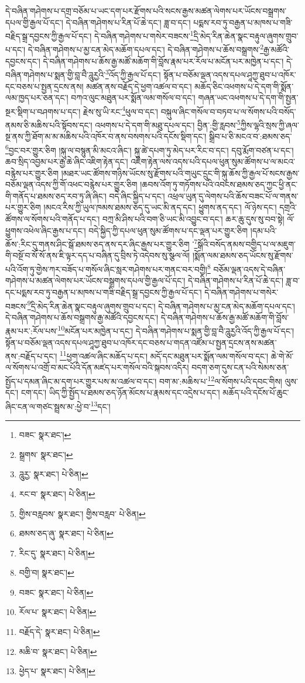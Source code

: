 དེ་བཞིན་གཤེགས་པ་དགྲ་བཅོམ་པ་ཡང་དག་པར་རྫོགས་པའི་སངས་རྒྱས་མཚན་ལེགས་པར་ཡོངས་བསྒྲགས་དཔལ་གྱི་རྒྱལ་པོ་དང་། དེ་བཞིན་གཤེགས་པ་རིན་པོ་ཆེ་དང་། ཟླ་བ་དང་། པདྨས་རབ་ཏུ་བརྒྱན་པ་མཁས་པ་གཟི་བརྗིད་སྒྲ་དབྱངས་ཀྱི་རྒྱལ་པོ་དང་། དེ་བཞིན་གཤེགས་པ་གསེར་བཟངས་\footnote{བཟང་  སྣར་ཐང་། }དྲི་མེད་རིན་ཆེན་སྣང་བརྟུལ་ཞུགས་གྲུབ་པ་དང་། དེ་བཞིན་གཤེགས་པ་མྱ་ངན་མེད་མཆོག་དཔལ་དང་། དེ་བཞིན་གཤེགས་པ་ཆོས་བསྒྲགས་\footnote{སྒྲགས་  སྣར་ཐང་། }རྒྱ་མཚོའི་དབྱངས་དང་། དེ་བཞིན་གཤེགས་པ་ཆོས་རྒྱ་མཚོ་མཆོག་གི་བློས་རྣམ་པར་རོལ་པ་མངོན་པར་མཁྱེན་པ་དང་། དེ་བཞིན་གཤེགས་པ་སྨན་གྱི་བླ་བཻ་ཌཱུརྱའི་\footnote{ཌཱུརྱ་  སྣར་ཐང་།  པེ་ཅིན། }འོད་ཀྱི་རྒྱལ་པོ་དང་། སྟོན་པ་བཅོམ་ལྡན་འདས་དཔལ་ཤཱཀྱ་ཐུབ་པ་འཁོར་དང་བཅས་པ་སྤྱན་དྲངས་ནས། མཚན་ནས་བརྗོད་དེ་ཕྱག་འཚལ་བ་དང་། མཆོད་ཅིང་འཕགས་པ་དེ་དག་གི་སྨོན་ལམ་ཁྱད་པར་ཅན་དང་། བཀའ་ལུང་མཐུན་པར་སྨོན་ལམ་གསོལ་བ་དང་། གཞན་ཡང་འཕགས་པ་དེ་དག་གི་སྤྱན་སྔར་སྡིག་པ་བཤགས་པ་དང་། རྗེས་སུ་ཡི་རང་\footnote{རང་བ་  སྣར་ཐང་།  པེ་ཅིན། }ཕུལ་བ་དང་། བསྐུལ་ཞིང་གསོལ་བ་བཏབ་པ་ལ་སོགས་པའི་བསོད་ནམས་ཅི་མཆིས་པའི་སྟོབས་དང་། འཕགས་པ་དེ་དག་གི་མཐུ་དཔལ་དང་། བྱིན་:གྱི་རླབས་\footnote{གྱིས་བརླབས་  སྣར་ཐང་། གྱིས་བརླབ་  པེ་ཅིན། }ཀྱིས་ལྷའི་སྲས་ཀྱི་ཞལ་སྔ་ནས་ཀྱི་ཐོག་མ་མ་མཆིས་པའི་འཁོར་བ་ནས་བསགས་པའི་དངོས་སྡིག་དང་། སྒྲིབ་པ་ཅི་མངའ་བ་:ཐམས་ཅད་\footnote{ཐམས་ཅད་ཞུ་  སྣར་ཐང་།  པེ་ཅིན། }བྱང་བར་གྱུར་ཅིག །སྐུ་ལ་བསྙུན་མི་མངའ་ཞིང་། སྐུ་ཚེ་དཔག་ཏུ་མེད་པར་རིང་བ་དང་། དབུ་རྨོག་བཙན་པ་དང་། ཆབ་སྲིད་འབྱམ་པར་རྒྱ་ཆེ་ཞིང་འཇིག་རྟེན་དང་། འཇིག་རྟེན་ལས་འདས་པའི་དཔལ་ཕུན་སུམ་ཚོགས་པ་ལ་མངའ་བརྙེས་པར་གྱུར་ཅིག །མཐར་ཡང་ཚོགས་གཉིས་ཡོངས་སུ་རྫོགས་པའི་གཡུང་དྲུང་གི་སྐུ་ཆོས་ཀྱི་རྒྱལ་པོ་སངས་རྒྱས་བཅོམ་ལྡན་འདས་ཀྱི་གོ་འཕང་བརྙེས་པར་གྱུར་ཅིག །ཆབས་འོག་ཏུ་གཏོགས་པའི་འབངས་ཐམས་ཅད་ཀྱང་ཕྱི་ནང་གི་གནོད་པ་ཐམས་ཅད་རབ་ཏུ་ཞི་ཞིང་། བདེ་ཞིང་སྐྱིད་པ་དང་། འཕྲལ་ཡུན་དུ་ལེགས་པའི་ཆོས་བཟང་པོ་ལ་གནས་པར་གྱུར་ཅིག །མངའ་རིས་ཀྱི་ཡུལ་ཁམས་ཐམས་ཅད་དུ་ཡང་མི་ནད་དང་། ཕྱུགས་ནད་དང་། ལོ་ཉེས་དང་། དགྲའི་ཚོགས་ལ་སོགས་པའི་གནོད་པ་དང་། བཀྲ་མི་ཤིས་པའི་བག་ཅི་ཡང་མི་འབྱུང་བ་དང་། ཆར་ཆུ་དུས་སུ་བབ་སྟེ། ལོ་ཕྱུགས་འཕེལ་ཞིང་རྒྱས་པ་དང་། བདེ་སྐྱིད་ཀྱི་དཔལ་ཕུན་སུམ་ཚོགས་པ་དང་ལྡན་པར་གྱུར་ཅིག །དམ་པའི་ཆོས་:རིང་དུ་གནས་ཤིང་སྒོ་ཐམས་ཅད་ནས་དར་ཞིང་རྒྱས་པར་གྱུར་ཅིག ་\footnote{རིང་དུ་  སྣར་ཐང་།  པེ་ཅིན། }སྒོའི་བསོད་ནམས་བགྱིད་པ་ལ་མཇུག་གི་བསྔོ་བ་སོ་སོ་ནས་ཇི་ལྟར་དད་པ་བཞིན་དུ་བྲིས་ཏེ་འདེབས་སུ་སྩལ་ལོ། །སྨོན་ལམ་ཐམས་ཅད་ཡོངས་སུ་རྫོགས་པའི་འོག་ཏུ་གྱེས་ཀར་བཟོད་པ་གསོལ་ཞིང་སླར་གཤེགས་པར་གནང་བར་བགྱི།\footnote{བགྱི་བ།  སྣར་ཐང་། } བཅོམ་ལྡན་འདས་དེ་བཞིན་གཤེགས་པ་མཚན་ལེགས་པར་ཡོངས་བསྒྲགས་དཔལ་གྱི་རྒྱལ་པོ་དང་། དེ་བཞིན་གཤེགས་པ་རིན་པོ་ཆེ་དང་། ཟླ་བ་དང་པདྨས་རབ་ཏུ་བརྒྱན་པ་མཁས་པ་གཟི་བརྗིད་སྒྲ་དབྱངས་ཀྱི་རྒྱལ་པོ་དང་། དེ་བཞིན་གཤེགས་པ་གསེར་བཟངས་\footnote{བཟང་  སྣར་ཐང་།  པེ་ཅིན། }དྲི་མེད་རིན་ཆེན་སྣང་བརྟུལ་ཞུགས་གྲུབ་པ་དང་། དེ་བཞིན་གཤེགས་པ་མྱ་ངན་མེད་མཆོག་དཔལ་དང་། དེ་བཞིན་གཤེགས་པ་ཆོས་བསྒྲགས་རྒྱ་མཚོའི་དབྱངས་དང་། དེ་བཞིན་གཤེགས་པ་ཆོས་རྒྱ་མཚོ་མཆོག་གི་བློས་རྣམ་པར་:རོལ་པས་\footnote{རོལ་པ་  སྣར་ཐང་།  པེ་ཅིན། }མངོན་པར་མཁྱེན་པ་དང་། དེ་བཞིན་གཤེགས་པ་སྨན་གྱི་བླ་བཻ་ཌཱུརྱའི་འོད་ཀྱི་རྒྱལ་པོ་དང་། སྟོན་པ་བཅོམ་ལྡན་འདས་དཔལ་ཤཱཀྱ་ཐུབ་པ་འཁོར་དང་བཅས་པ་གདན་འཛོམ་པ་སྤྱན་དྲངས་ནས་མཚན་ནས་:བརྗོད་པ་དང་། \footnote{བརྗོད་དེ་  སྣར་ཐང་།  པེ་ཅིན། }ཕྱག་འཚལ་ཞིང་མཆོད་པ་དང་། མདོ་དང་མཐུན་པར་སྨོན་ལམ་གསོལ་བ་དང་། ཆེ་གེ་མོ་ལ་སོགས་པ་འགྲོ་བ་མང་པོའི་དོན་མཛད་པར་གསོལ་བའི་སྐབས་འདིར། བདག་ཅག་དུས་ངན་པའི་སེམས་ཅན་སྤྱོད་པ་དམན་ཞིང་མ་དག་པར་གྱུར་པས་མ་འཚལ་བ་དང་། བག་མ་:མཆིས་པ་\footnote{མཆི་བ་  སྣར་ཐང་།  པེ་ཅིན། }ལ་སོགས་པའི་དབང་གིས། ལུས་དང་། ངག་དང་། ཡིད་ཀྱི་སྤྱོད་པ་ཐམས་ཅད་ཉོན་མོངས་པ་རྣམས་དང་འདྲེས་པ་དང་། མཆོད་པའི་དངོས་པོ་ཆུང་ཞིང་ངན་ལ་གཙང་སྦྲས་མ་:ཕྱེ་བ་\footnote{ཕྱེད་པ་  སྣར་ཐང་།  པེ་ཅིན། }དང་། 